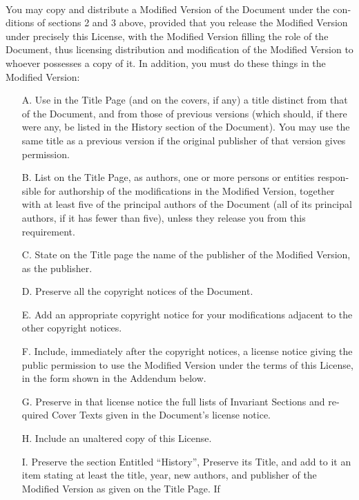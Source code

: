 \documentclass[11pt,a5paper,twoside]{book}
\begin{document}
\begin{english}
\paragraph{}You may copy and distribute a Modified Version of the Document under
the conditions of sections 2 and 3 above, provided that you release
the Modified Version under precisely this License, with the Modified
Version filling the role of the Document, thus licensing distribution
and modification of the Modified Version to whoever possesses a copy
of it.  In addition, you must do these things in the Modified Version:
\begin{itemize}
\item[A.]
   Use in the Title Page (and on the covers, if any) a title distinct
   from that of the Document, and from those of previous versions
   (which should, if there were any, be listed in the History section
   of the Document).  You may use the same title as a previous version
   if the original publisher of that version gives permission.
\item[B.]
   List on the Title Page, as authors, one or more persons or entities
   responsible for authorship of the modifications in the Modified
   Version, together with at least five of the principal authors of the
   Document (all of its principal authors, if it has fewer than five),
   unless they release you from this requirement.
\item[C.]
   State on the Title page the name of the publisher of the
   Modified Version, as the publisher.
\item[D.]
   Preserve all the copyright notices of the Document.
\item[E.]
   Add an appropriate copyright notice for your modifications
   adjacent to the other copyright notices.
\item[F.]
   Include, immediately after the copyright notices, a license notice
   giving the public permission to use the Modified Version under the
   terms of this License, in the form shown in the Addendum below.
\item[G.]
   Preserve in that license notice the full lists of Invariant Sections
   and required Cover Texts given in the Document’s license notice.
\item[H.]
   Include an unaltered copy of this License.
\item[I.]
   Preserve the section Entitled “History”, Preserve its Title, and add
   to it an item stating at least the title, year, new authors, and
   publisher of the Modified Version as given on the Title Page.  If

\end{itemize}
\end{english}
\end{document}
